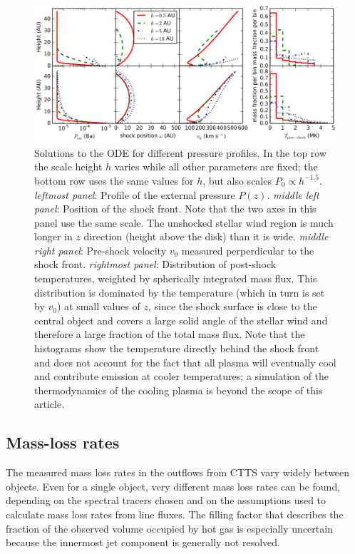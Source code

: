 \documentclass{emulateapj}
\begin{document}
\begin{figure}[h!]
\begin{center}
\includegraphics[width=1\columnwidth]{figures/P_ext/P_ext.png}
\caption{\label{fig:p_ext}
Solutions to the ODE for different pressure profiles. In the top row the scale height $h$ varies while all other parameters are fixed; the bottom row uses the same values for $h$, but also scales $P_0\propto h^{-1.5}$.
\emph{leftmost panel}: Profile of the external pressure $P(z)$. 
\emph{middle left panel}: Position of the shock front. Note that the two axes in this panel use the same scale. The unshocked stellar wind region is much longer in $z$ direction (height above the disk) than it is wide. 
\emph{middle right panel}: Pre-shock velocity $v_0$ measured perperdicular to the shock front. 
\emph{rightmost panel}: Distribution of post-shock temperatures, weighted by spherically integrated mass flux. This distribution is dominated by the temperature (which in turn is set by $v_0$) at small values of $z$, since the shock surface is close to the central object and covers a large solid angle of the stellar wind and therefore a large fraction of the total mass flux. Note that the histograms show the temperature directly behind the shock front and does not account for the fact that all plasma will eventually cool and contribute emission at cooler temperatures; a simulation of the thermodynamics of the cooling plasma is beyond the scope of this article.}
\end{center}
\end{figure}

\subsection{Mass-loss rates}
\label{sect:masslossrates}
The measured mass loss rates in the outflows from CTTS vary widely between objects.  Even for a single object, very different mass loss rates can be found, depending on the spectral tracers chosen and on the assumptions used to calculate mass loss rates from line fluxes. The filling factor that describes the fraction of the observed volume occupied by hot gas is especially uncertain because the innermost jet component is generally not resolved.
\end{document}
